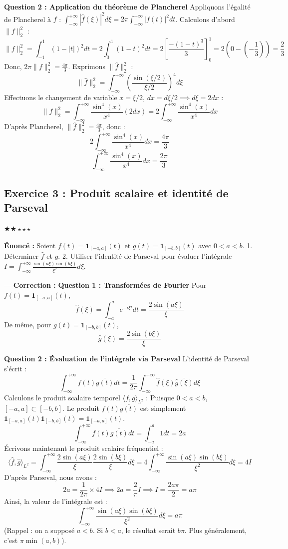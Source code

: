 \documentclass[11pt,a4paper]{article}
\begin{document}
\textbf{Question 2 : Application du théorème de Plancherel}
Appliquons l'égalité de Plancherel à $f$ : $\int_{-\infty}^{+\infty} |\hat{f}(\xi)|^2 d\xi = 2\pi \int_{-\infty}^{+\infty} |f(t)|^2 dt$.
Calculons d'abord $\|f\|_2^2$ :
$$ \|f\|_2^2 = \int_{-1}^{1} (1-|t|)^2 dt = 2 \int_{0}^{1} (1-t)^2 dt = 2 \left[ \frac{-(1-t)^3}{3} \right]_0^1 = 2 \left( 0 - \left(-\frac{1}{3}\right) \right) = \frac{2}{3} $$
Donc, $2\pi \|f\|_2^2 = \frac{4\pi}{3}$.
Exprimons $\|\hat{f}\|_2^2$ :
$$ \|\hat{f}\|_2^2 = \int_{-\infty}^{+\infty} \left(\frac{\sin(\xi/2)}{\xi/2}\right)^4 d\xi $$
Effectuons le changement de variable $x = \xi/2$, $dx = d\xi/2 \implies d\xi = 2dx$ :
$$ \|\hat{f}\|_2^2 = \int_{-\infty}^{+\infty} \frac{\sin^4(x)}{x^4} (2dx) = 2 \int_{-\infty}^{+\infty} \frac{\sin^4(x)}{x^4} dx $$
D'après Plancherel, $\|\hat{f}\|_2^2 = \frac{4\pi}{3}$, donc :
$$ 2 \int_{-\infty}^{+\infty} \frac{\sin^4(x)}{x^4} dx = \frac{4\pi}{3} $$
$$ \int_{-\infty}^{+\infty} \frac{\sin^4(x)}{x^4} dx = \frac{2\pi}{3} $$


\subsection*{Exercice 3 : Produit scalaire et identité de Parseval}
$\bigstar\bigstar\star\star\star$

\textbf{Énoncé :}
Soient $f(t) = \mathbf{1}_{[-a, a]}(t)$ et $g(t) = \mathbf{1}_{[-b, b]}(t)$ avec $0 < a < b$.
1. Déterminer $\hat{f}$ et $\hat{g}$.
2. Utiliser l'identité de Parseval pour évaluer l'intégrale $I = \int_{-\infty}^{+\infty} \frac{\sin(a\xi)\sin(b\xi)}{\xi^2} d\xi$.

---
\textbf{Correction :}
\textbf{Question 1 : Transformées de Fourier}
Pour $f(t) = \mathbf{1}_{[-a, a]}(t)$,
$$ \hat{f}(\xi) = \int_{-a}^{a} e^{-i\xi t} dt = \frac{2\sin(a\xi)}{\xi} $$
De même, pour $g(t) = \mathbf{1}_{[-b, b]}(t)$,
$$ \hat{g}(\xi) = \frac{2\sin(b\xi)}{\xi} $$

\textbf{Question 2 : Évaluation de l'intégrale via Parseval}
L'identité de Parseval s'écrit :
$$ \int_{-\infty}^{+\infty} f(t) \overline{g(t)} dt = \frac{1}{2\pi} \int_{-\infty}^{+\infty} \hat{f}(\xi) \overline{\hat{g}(\xi)} d\xi $$
Calculons le produit scalaire temporel $\langle f, g \rangle_{L^2}$ :
Puisque $0 < a < b$, $[-a, a] \subset [-b, b]$. Le produit $f(t)\overline{g(t)}$ est simplement $\mathbf{1}_{[-a, a]}(t) \mathbf{1}_{[-b, b]}(t) = \mathbf{1}_{[-a, a]}(t)$.
$$ \int_{-\infty}^{+\infty} f(t) \overline{g(t)} dt = \int_{-a}^{a} 1 dt = 2a $$
Écrivons maintenant le produit scalaire fréquentiel :
$$ \langle \hat{f}, \hat{g} \rangle_{L^2} = \int_{-\infty}^{+\infty} \frac{2\sin(a\xi)}{\xi} \frac{2\sin(b\xi)}{\xi} d\xi = 4 \int_{-\infty}^{+\infty} \frac{\sin(a\xi)\sin(b\xi)}{\xi^2} d\xi = 4I $$
D'après Parseval, nous avons :
$$ 2a = \frac{1}{2\pi} \times 4I \implies 2a = \frac{2}{\pi} I \implies I = \frac{2a\pi}{2} = a\pi $$
Ainsi, la valeur de l'intégrale est :
$$ \int_{-\infty}^{+\infty} \frac{\sin(a\xi)\sin(b\xi)}{\xi^2} d\xi = a\pi $$
(Rappel : on a supposé $a < b$. Si $b < a$, le résultat serait $b\pi$. Plus généralement, c'est $\pi \min(a,b)$).
\end{document}
